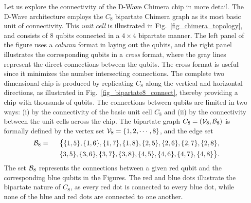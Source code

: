\documentclass[preprint,12pt,eqsecnum,nofootinbib,amsmath,amssymb]{revtex4}
\begin{document}
%
Let us explore the connectivity of the D-Wave Chimera chip in more detail. The D-Wave 
architecture employs the $C_8$ bipartate Chimera graph as its most basic unit of connectivity.  
This {\em unit cell } is illustrated in Fig.~\ref{fig_chimera_topology}, and consists of 8 qubits 
connected in a $4 \times 4$ bipartate manner. The left panel of the figure uses a {\em column} 
format in laying out the qubits, and the right panel illustrates the corresponding qubits in a 
{\em cross} format, where the gray lines represent the direct connections between the qubits. 
The cross format is useful since it minimizes the number intersecting connections. The complete 
two dimensional chip is produced by replicating  $C_8$ along the vertical and horizontal 
directions, as illustrated in Fig.~\ref{fig_bipartate8_connect}, thereby providing a chip with 
thousands of qubits. The connections between qubits are limited in two ways: (i) by the 
connectivity of the basic unit cell $C_8$ and (ii) by the connectivity between the unit cells 
across the chip. The bipartate graph $C_8 = ( {\cal V}_8, {\cal B}_8 )$ is formally defined by
the vertex set ${\cal V}_8=\{1, 2, \cdots, 8 \}$, and the edge set
%
\begin{eqnarray}
  {\cal B}_8 
  &=& 
  \big\{ \{1, 5\} , \{1, 6\} , \{1, 7\} , \{1, 8\} , 
  \{2, 5\} ,\{2, 6\} , \{2, 7\}  , \{2, 8\} ,
  \nonumber
  \\
  && 
  ~~
  \{3, 5\} ,\{3, 6\} , \{3, 7\}  , \{3, 8\} ,
  \{4, 5\} ,\{4, 6\} , \{4, 7\}  , \{4, 8\} 
  \big\}. 
  \label{eq_bipartate_eight}
\end{eqnarray}
%
The set ${\cal B}_8$  represents the connections between a given red qubit and 
the corresponding blue qubits in the Figures. The red and blue dots illustrate the 
bipartate nature of $C_8$, as every red dot is connected to every blue dot, while 
none of the blue and red dots are connected to one another. 
\end{document}
